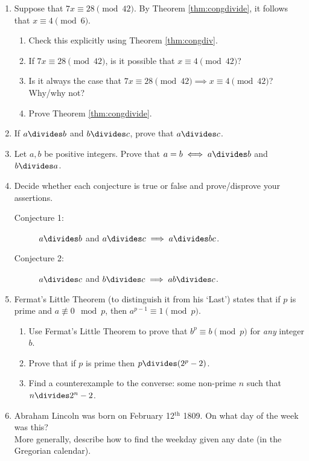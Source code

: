 \begin{enumerate}
  \item\label{ex:thmcongdivide} Suppose that $7x\equiv 28\pmod{42}$. By Theorem \ref{thm:congdivide}, it follows that $x\equiv 4\pmod{6}$.
  \begin{enumerate}
    \item Check this explicitly using Theorem \ref{thm:congdiv}.
    \item If $7x\equiv 28\pmod{42}$, is it possible that $x\equiv 4\pmod{42}$?
    \item Is it always the case that $7x\equiv 28\pmod{42}\implies x\equiv 4\pmod{42}$? Why/why not?
    \item Prove Theorem \ref{thm:congdivide}.
  \end{enumerate}
  
  \item If $a\divides b$ and $b\divides c$, prove that $a\divides c$.
  
  \item\label{ex:adivb} Let $a,b$ be positive integers. Prove that $a=b\iff a\divides b$ and $b\divides a$.
  
  \item Decide whether each conjecture is true or false and prove/disprove your assertions.
  \begin{description}
    \item[Conjecture 1:] $a\divides b$ and $a\divides c\implies a\divides bc$.
    \item[Conjecture 2:] $a\divides c$ and $b\divides c\implies ab\divides c$.
  \end{description}

	\item Fermat's Little Theorem (to distinguish it from his `Last') states that if $p$ is prime and $a\not\equiv 0\mod p$, then $a^{p-1}\equiv 1\pmod p$.
	\begin{enumerate}
	  \item Use Fermat's Little Theorem to prove that $b^p\equiv b\pmod p$ for \emph{any} integer $b$.
	  \item Prove that if $p$ is prime then $p\divides (2^p-2)$.
	  \item Find a counterexample to the converse: some non-prime $n$ such that $n\divides 2^n-2$.
	\end{enumerate}
	
	\item Abraham Lincoln was born on February 12$^\text{th}$ 1809. On what day of the week was this?\\
	More generally, describe how to find the weekday given any date (in the Gregorian calendar).
\end{enumerate}\newpage

